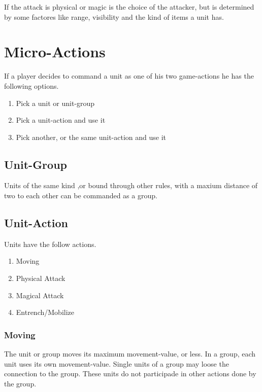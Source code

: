 \documentclass[a5paper,pagesize,10pt,bibtotoc,pointlessnumbers,
normalheadings,DIV=9,twoside=false]{scrbook}
\begin{document}
If the attack is physical or magic is the choice of the attacker, but is determined by some factores like range, visibility and the kind of items a unit has.

\section{Micro-Actions}
If a player decides to command a unit as one of his two game-actions he has the following options.

\begin{enumerate}
\item Pick a unit or unit-group
\item Pick a unit-action and use it
\item Pick another, or the same unit-action and use it
\end{enumerate}

\subsection{Unit-Group}
Units of the same kind ,or bound through other rules, with a maxium distance of two to each other can be commanded as a group.

\subsection{Unit-Action}
Units have the follow actions.

\begin{enumerate}
\item Moving
\item Physical Attack
\item Magical Attack
\item Entrench/Mobilize
\end{enumerate}

\subsubsection{Moving}
The unit or group moves its maximum movement-value, or less.
In a group, each unit uses its own movement-value. Single units of a group may loose the connection to the group. These units do not participade in other actions done by the group.
\end{document}
